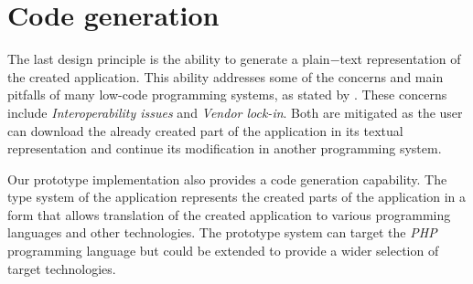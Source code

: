 \section{Code generation}

The last design principle is the ability to generate a plain−text representation of the created application.
This ability addresses some of the concerns and main pitfalls of many low-code programming systems, as stated by \citet{Pinho_Aguiar_Amaral_2023}.
These concerns include \emph{Interoperability issues} and \emph{Vendor lock-in}.
Both are mitigated as the user can download the already created part of the application in its textual representation and continue its modification in another programming system.

Our prototype implementation also provides a code generation capability.
The type system of the application represents the created parts of the application in a form that allows translation of the created application to various programming languages and other technologies.
The prototype system can target the \emph{PHP} programming language but could be extended to provide a wider selection of target technologies.













